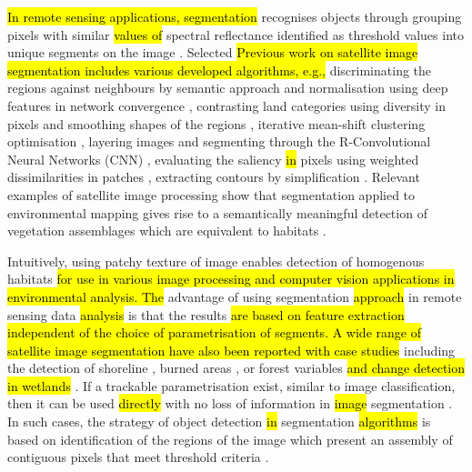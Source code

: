 \documentclass[sustainability,article,submit,pdftex,moreauthors]{Definitions/mdpi}
\begin{document}
\hl{In remote sensing applications, segmentation }recognises objects through grouping pixels with similar \hl{values of }spectral reflectance identified as\hl{ }threshold values into unique segments on the image \cite{PAL20229964}. Selected \hl{Previous work on satellite image segmentation includes various developed algorithms, e.g., }discriminating the regions against neighbours by semantic approach and normalisation using deep features in network convergence \cite{WANG2023108734}, contrasting land categories using diversity in pixels and smoothing shapes of the regions \cite{MAURYA2023102078}, iterative mean-shift clustering optimisation \cite{6351712}, layering images and segmenting through the R-Convolutional Neural Networks (CNN) \cite{8519391}, evaluating the saliency \hl{in} pixels using weighted\hl{ }dissimilarities in patches \cite{6727739}, extracting contours by simplification \cite{WU20151133,8630683}. Relevant examples of satellite image processing show that segmentation applied to environmental mapping gives rise to a semantically meaningful detection of vegetation assemblages which are equivalent to habitats \cite{MUNYATI20131}. 

Intuitively, using patchy texture of image enables detection of homogenous habitats \hl{for use in various image processing and computer vision applications in environmental analysis. The} advantage of using segmentation \hl{approach }in remote sensing data \hl{analysis} is that the results \hl{are based on feature extraction independent of the choice of parametrisation of segments. A wide range of satellite image segmentation have also been reported with case studies} including the detection of shoreline \cite{ERDEM2021964}, burned areas \cite{KOTARIDIS2023100944,Toulouse}, or forest variables \cite{MAKELA200166} \hl{and change detection in wetlands} \cite{ZHANG2023129590}. If a trackable parametrisation exist, similar to image classification, then it can be used \hl{directly }with no loss of information in\hl{ image }segmentation \cite{Kharma}. In such cases, the strategy of object detection \hl{in} segmentation \hl{algorithms }is based on identification of the regions of the image which present an assembly of contiguous pixels that meet threshold criteria \cite{Aalan,Awad}. 
\end{document}
